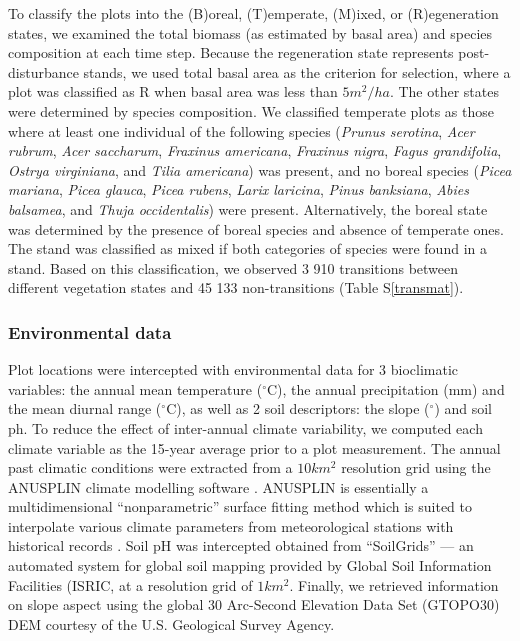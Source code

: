To classify the plots into the (B)oreal, (T)emperate, (M)ixed, or (R)egeneration states, we examined
the total biomass (as estimated by basal area) and species composition at each time step. Because
the regeneration state represents post-disturbance stands, we used total basal area as the criterion
for selection, where a plot was classified as R when basal area was less than $5m^2/ha$. The other
states were determined by species composition. We classified temperate plots as those where at least
one individual of the following species (\textit{Prunus serotina}, \textit{Acer rubrum},
\textit{Acer saccharum}, \textit{Fraxinus americana}, \textit{Fraxinus nigra}, \textit{Fagus
grandifolia}, \textit{Ostrya virginiana}, and \textit{Tilia americana}) was present, and no boreal
species (\textit{Picea mariana}, \textit{Picea glauca}, \textit{Picea rubens}, \textit{Larix
laricina}, \textit{Pinus banksiana}, \textit{Abies balsamea}, and \textit{Thuja occidentalis}) were
present. Alternatively, the boreal state was determined by the presence of boreal species and
absence of temperate ones. The stand was classified as mixed if both categories of species were
found in a stand. Based on this classification, we observed 3 910 transitions between different
vegetation states and 45 133 non-transitions (Table S\ref{transmat}).

\subsubsection*{Environmental data}

Plot locations were intercepted with environmental data for 3 bioclimatic variables: the annual mean
temperature ($^{\circ}$C), the annual precipitation (mm) and the mean diurnal range ($^{\circ}$C),
as well as 2 soil descriptors: the slope ($^{\circ}$) and soil ph. To reduce the effect of
inter-annual climate variability, we computed each climate variable as the 15-year average prior to
a plot measurement. The annual past climatic conditions were extracted from a $10km^2$ resolution
grid using the ANUSPLIN climate modelling software \citep{McKenney2011}. ANUSPLIN is essentially a
multidimensional “nonparametric” surface fitting method which is suited to interpolate various
climate parameters from meteorological stations with historical records \citep[Method description
in][]{McKenney2011}. Soil pH was intercepted obtained from “SoilGrids” — an automated system for
global soil mapping provided by Global Soil Information Facilities (ISRIC, \citep[Method description
in][]{Hengl2014} at a resolution grid of $1km^2$. Finally, we retrieved information on slope aspect
using the global 30 Arc-Second Elevation Data Set (GTOPO30) DEM courtesy of the U.S. Geological
Survey Agency.

